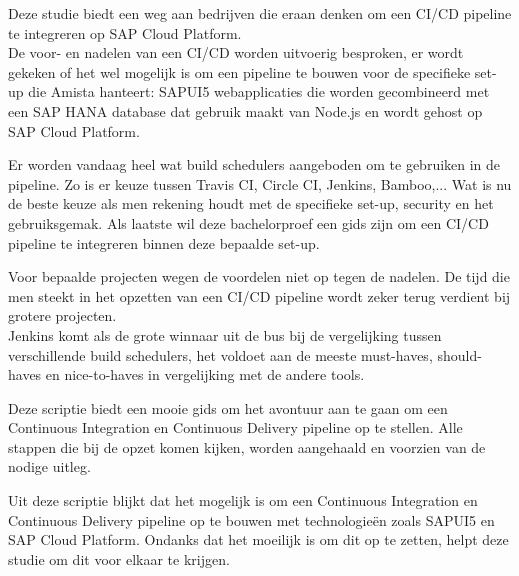 Deze studie biedt een weg aan bedrijven die eraan denken om een CI/CD pipeline te integreren op SAP Cloud Platform. \\
De voor- en nadelen van een CI/CD worden uitvoerig besproken, er wordt gekeken of het wel mogelijk is om een pipeline te bouwen voor de specifieke set-up die Amista hanteert: SAPUI5 webapplicaties die worden gecombineerd met een SAP HANA database dat gebruik maakt van Node.js en wordt gehost op SAP Cloud Platform.

Er worden vandaag heel wat build schedulers aangeboden om te gebruiken in de pipeline. Zo is er keuze tussen Travis CI, Circle CI, Jenkins, Bamboo,... Wat is nu de beste keuze als men rekening houdt met de specifieke set-up, security en het gebruiksgemak.
Als laatste wil deze bachelorproef een gids zijn om een CI/CD pipeline te integreren binnen deze bepaalde set-up.

Voor bepaalde projecten wegen de voordelen niet op tegen de nadelen. De tijd die men steekt in het opzetten van een CI/CD pipeline wordt zeker terug verdient bij grotere projecten.\\
Jenkins komt als de grote winnaar uit de bus bij de vergelijking tussen verschillende build schedulers, het voldoet aan de meeste must-haves, should-haves en nice-to-haves in vergelijking met de andere tools.

Deze scriptie biedt een mooie gids om het avontuur aan te gaan om een Continuous Integration en Continuous Delivery pipeline op te stellen. Alle stappen die bij de opzet komen kijken, worden aangehaald en voorzien van de nodige uitleg.

Uit deze scriptie blijkt dat het mogelijk is om een Continuous Integration en Continuous Delivery pipeline op te bouwen met technologieën zoals SAPUI5 en SAP Cloud Platform. Ondanks dat het moeilijk is om dit op te zetten, helpt deze studie om dit voor elkaar te krijgen.
